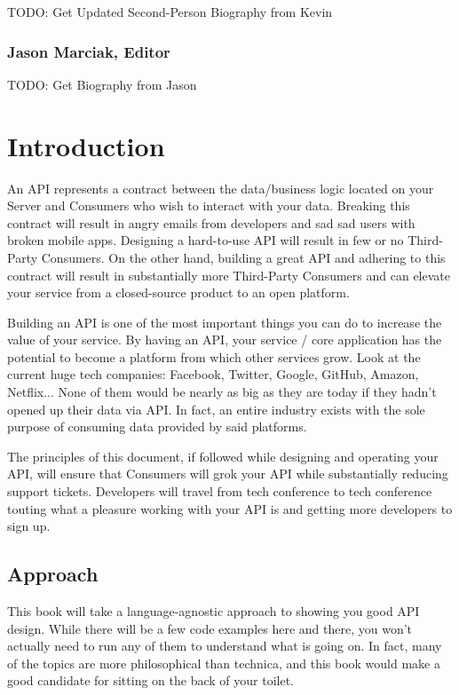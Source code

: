 \documentclass{book}
\begin{document}
TODO: Get Updated Second-Person Biography from Kevin

\subsubsection*{Jason Marciak, Editor}

TODO: Get Biography from Jason

\tableofcontents

\newpage

\section{Introduction}

An API represents a contract between the data/business logic located on your Server and Consumers who wish to interact with your data. Breaking this contract will result in angry emails from developers and sad sad users with broken mobile apps. Designing a hard-to-use API will result in few or no Third-Party Consumers. On the other hand, building a great API and adhering to this contract will result in substantially more Third-Party Consumers and can elevate your service from a closed-source product to an open platform.

Building an API is one of the most important things you can do to increase the value of your service. By having an API, your service / core application has the potential to become a platform from which other services grow. Look at the current huge tech companies: Facebook, Twitter, Google, GitHub, Amazon, Netflix... None of them would be nearly as big as they are today if they hadn't opened up their data via API. In fact, an entire industry exists with the sole purpose of consuming data provided by said platforms.

The principles of this document, if followed while designing and operating your API, will ensure that Consumers will grok your API while substantially reducing support tickets. Developers will travel from tech conference to tech conference touting what a pleasure working with your API is and getting more developers to sign up.

\subsection{Approach}

This book will take a language-agnostic approach to showing you good API design. While there will be a few code examples here and there, you won't actually need to run any of them to understand what is going on. In fact, many of the topics are more philosophical than technica, and this book would make a good candidate for sitting on the back of your toilet.
\end{document}
